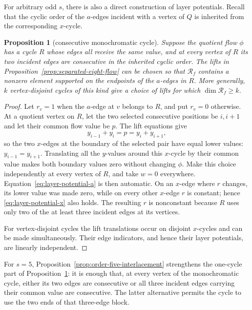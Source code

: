\documentclass[11pt,a4paper]{article}
\newtheorem{proposition}[theorem]{Proposition}
\theoremstyle{definition}
\theoremstyle{remark}
\begin{document}
For arbitrary odd $s$, there is also a direct construction of layer potentials.  Recall that the cyclic order of the $a$-edges incident with a vertex of $Q$ is inherited from the corresponding $x$-cycle.

\begin{proposition}[consecutive monochromatic cycle]\label{prop:mono-cycle}
Suppose the quotient flow $\phi$ has a cycle $R$ whose edges all receive the same value, and at every vertex of $R$ its two incident edges are consecutive in the inherited cyclic order.  The lifts in Proposition~\ref{prop:separated-eight-flow} can be chosen so that $\mathcal R_f$ contains a nonzero element supported on the endpoints of the $a$-edges in $R$.  More generally, $k$ vertex-disjoint cycles of this kind give a choice of lifts for which $\dim\mathcal R_f\ge k$.
\end{proposition}
\begin{proof}
Let $r_v=1$ when the $a$-edge at $v$ belongs to $R$, and put $r_v=0$ otherwise.  At a quotient vertex on $R$, let the two selected consecutive positions be $i,i+1$ and let their common flow value be $p$.  The lift equations give
\[
 y_{i-1}+y_i=p=y_i+y_{i+1},
\]
so the two $x$-edges at the boundary of the selected pair have equal lower values: $y_{i-1}=y_{i+1}$.  Translating all the $y$-values around this $x$-cycle by their common value makes both boundary values zero without changing $\phi$.  Make this choice independently at every vertex of $R$, and take $w=0$ everywhere.  Equation~\eqref{eq:layer-potential-a} is then automatic.  On an $x$-edge where $r$ changes, its lower value was made zero, while on every other $x$-edge $r$ is constant; hence \eqref{eq:layer-potential-x} also holds.  The resulting $r$ is nonconstant because $R$ uses only two of the at least three incident edges at its vertices.

For vertex-disjoint cycles the lift translations occur on disjoint $x$-cycles and can be made simultaneously.  Their edge indicators, and hence their layer potentials, are linearly independent.
\end{proof}

For $s=5$, Proposition~\ref{prop:order-five-interlacement} strengthens the one-cycle part of Proposition~\ref{prop:mono-cycle}: it is enough that, at every vertex of the monochromatic cycle, either its two edges are consecutive or all three incident edges carrying their common value are consecutive.  The latter alternative permits the cycle to use the two ends of that three-edge block.
\end{document}
